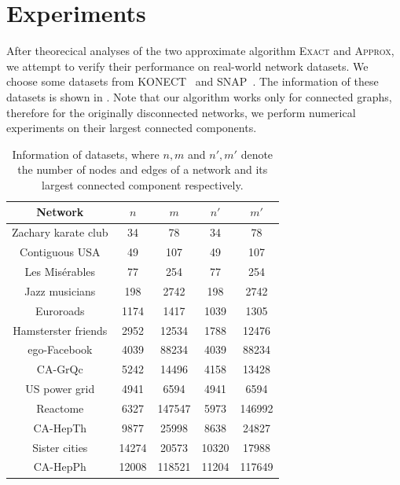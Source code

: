 \documentclass[sigconf]{acmart}
\begin{document}
\section{Experiments}

After theorecical analyses of the two approximate algorithm \textsc{Exact} and \textsc{Approx}, we attempt to verify their performance on real-world network datasets.
We choose some datasets from KONECT~\cite{Ku13} and SNAP~\cite{JuAn14}.
The information of these datasets is shown in .
Note that our algorithm works only for connected graphs, therefore for the originally disconnected networks, we perform numerical experiments on their largest connected components.
\begin{table}
    \caption{Information of datasets, where \(n,m\) and \(n',m'\) denote the number of nodes and edges of a network and its largest connected component respectively.}
    \label{tab:info}
    \begin{tabular}{ccccc}
        \toprule
        Network             & \(n\)   & \(m\)   & \(n'\)  & \(m'\)  \\
        \midrule
        Zachary karate club & 34      & 78      & 34      & 78      \\
        Contiguous USA      & 49      & 107     & 49      & 107     \\
        Les Misérables      & 77      & 254     & 77      & 254     \\
        Jazz musicians      & 198     & 2742    & 198     & 2742    \\
        Euroroads           & 1174    & 1417    & 1039    & 1305    \\
        Hamsterster friends & 2952    & 12534   & 1788    & 12476   \\
        ego-Facebook        & 4039    & 88234   & 4039    & 88234   \\
        CA-GrQc             & 5242    & 14496   & 4158    & 13428   \\
        US power grid       & 4941    & 6594    & 4941    & 6594    \\
        Reactome            & 6327    & 147547  & 5973    & 146992  \\
        CA-HepTh            & 9877    & 25998   & 8638    & 24827   \\
        Sister cities       & 14274   & 20573   & 10320   & 17988   \\
        CA-HepPh            & 12008   & 118521  & 11204   & 117649  \\

\end{tabular}
\end{table}
\end{document}
